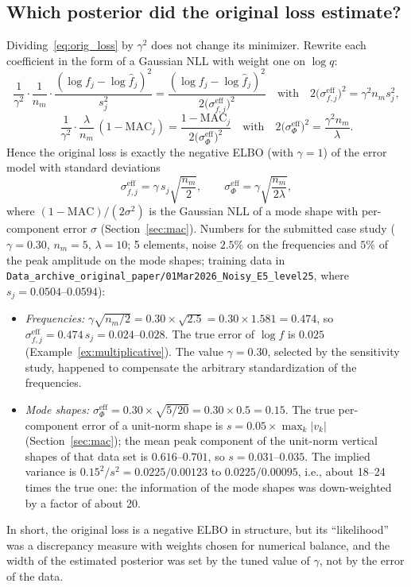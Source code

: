 \documentclass[11pt,a4paper]{article}
\numberwithin{equation}{section}
\theoremstyle{plain}
\theoremstyle{definition}
\theoremstyle{remark}
\newcommand{\MAC}{\mathrm{MAC}}
\begin{document}
\subsection{Which posterior did the original loss estimate?}
\label{sec:implied}
Dividing~\eqref{eq:orig_loss} by $\gamma^2$ does not change its minimizer. Rewrite each coefficient in the form of a Gaussian NLL with weight one on $\log q$:
\begin{equation*}
\frac{1}{\gamma^2}\cdot\frac{1}{n_m}\cdot\frac{(\log f_j-\log\hat f_j)^2}{s_j^2}=\frac{(\log f_j-\log\hat f_j)^2}{2\big(\sigma^{\text{eff}}_{f,j}\big)^2}
\quad\text{with}\quad 2\big(\sigma^{\text{eff}}_{f,j}\big)^2=\gamma^2n_ms_j^2,
\end{equation*}
\begin{equation*}
\frac{1}{\gamma^2}\cdot\frac{\lambda}{n_m}\,(1-\MAC_j)=\frac{1-\MAC_j}{2\big(\sigma^{\text{eff}}_{\Phi}\big)^2}
\quad\text{with}\quad 2\big(\sigma^{\text{eff}}_{\Phi}\big)^2=\frac{\gamma^2n_m}{\lambda}.
\end{equation*}
Hence the original loss is exactly the negative ELBO (with $\gamma=1$) of the error model with standard deviations
\begin{equation}
\sigma^{\text{eff}}_{f,j}=\gamma\,s_j\sqrt{\frac{n_m}{2}},\qquad
\sigma^{\text{eff}}_{\Phi}=\gamma\sqrt{\frac{n_m}{2\lambda}},
\label{eq:implied_sigma}
\end{equation}
where $(1-\MAC)/(2\sigma^2)$ is the Gaussian NLL of a mode shape with per-component error $\sigma$ (Section~\ref{sec:mac}).
Numbers for the submitted case study ($\gamma=0.30$, $n_m=5$, $\lambda=10$; 5 elements, noise $2.5\%$ on the frequencies and $5\%$ of the peak amplitude on the mode shapes; training data in \texttt{Data\_archive\_original\_paper/01Mar2026\_Noisy\_E5\_level25}, where $s_j=0.0504$--$0.0594$):
\begin{itemize}
\item \emph{Frequencies:} $\gamma\sqrt{n_m/2}=0.30\times\sqrt{2.5}=0.30\times1.581=0.474$, so $\sigma^{\text{eff}}_{f,j}=0.474\,s_j=0.024$--$0.028$. The true error of $\log f$ is $0.025$ (Example~\ref{ex:multiplicative}). The value $\gamma=0.30$, selected by the sensitivity study, happened to compensate the arbitrary standardization of the frequencies.
\item \emph{Mode shapes:} $\sigma^{\text{eff}}_\Phi=0.30\times\sqrt{5/20}=0.30\times0.5=0.15$. The true per-component error of a unit-norm shape is $s=0.05\times\max_k|v_k|$ (Section~\ref{sec:mac}); the mean peak component of the unit-norm vertical shapes of that data set is $0.616$--$0.701$, so $s=0.031$--$0.035$. The implied variance is $0.15^2/s^2=0.0225/0.00123$ to $0.0225/0.00095$, i.e., about 18--24 times the true one: the information of the mode shapes was down-weighted by a factor of about 20.
\end{itemize}
In short, the original loss is a negative ELBO in structure, but its ``likelihood'' was a discrepancy measure with weights chosen for numerical balance, and the width of the estimated posterior was set by the tuned value of $\gamma$, not by the error of the data.
\end{document}
